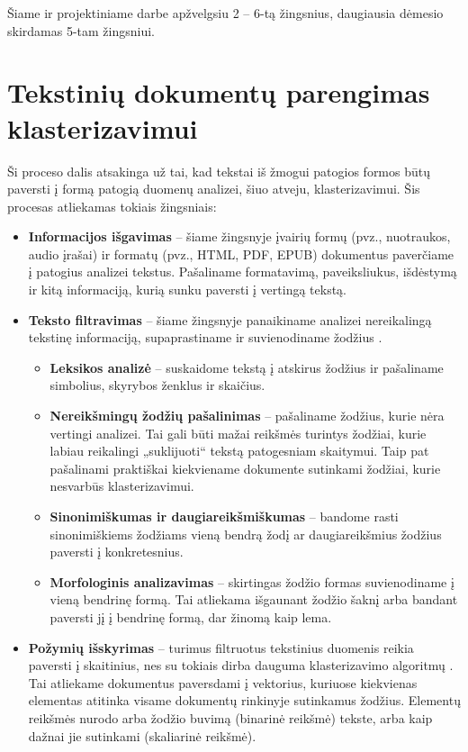 \documentclass{VUMIFInfKursinis}
\begin{document}
Šiame ir projektiniame darbe apžvelgsiu 2 – 6-tą žingsnius, daugiausia
dėmesio skirdamas 5-tam žingsniui.











\section{Tekstinių dokumentų parengimas klasterizavimui}

Ši proceso dalis atsakinga už tai, kad tekstai iš žmogui patogios formos
būtų paversti į formą patogią duomenų analizei, šiuo atveju,
klasterizavimui. Šis procesas atliekamas tokiais žingsniais:

\begin{itemize}
\item
  \textbf{Informacijos išgavimas} – šiame žingsnyje įvairių formų
  (pvz., nuotraukos, audio įrašai) ir formatų (pvz., HTML, PDF, EPUB)
  dokumentus paverčiame į patogius analizei tekstus. Pašaliname
  formatavimą, paveiksliukus, išdėstymą ir kitą informaciją, kurią sunku
  paversti į vertingą tekstą.
\item
  \textbf{Teksto filtravimas} – šiame žingsnyje panaikiname analizei
  nereikalingą tekstinę informaciją, supaprastiname ir suvienodiname
  žodžius \cite{mugunthadevi2011survey}.

  \begin{itemize}
  \item
    \textbf{Leksikos analizė} – suskaidome tekstą į atskirus žodžius ir
    pašaliname simbolius, skyrybos ženklus ir skaičius.
  \item
    \textbf{Nereikšmingų žodžių pašalinimas} – pašaliname žodžius,
    kurie nėra vertingi analizei. Tai gali būti mažai reikšmės turintys
    žodžiai, kurie labiau reikalingi „suklijuoti“ tekstą patogesniam
    skaitymui. Taip pat pašalinami praktiškai kiekviename dokumente
    sutinkami žodžiai, kurie nesvarbūs klasterizavimui.
  \item
    \textbf{Sinonimiškumas ir daugiareikšmiškumas} – bandome rasti
    sinonimiškiems žodžiams vieną bendrą žodį ar daugiareikšmius žodžius
    paversti į konkretesnius.
  \item
    \textbf{Morfologinis analizavimas} – skirtingas žodžio formas
    suvienodiname į vieną bendrinę formą. Tai atliekama išgaunant žodžio
    šaknį arba bandant paversti jį į bendrinę formą, dar žinomą kaip
    lema.
  \end{itemize}
\item
  \textbf{Požymių išskyrimas} – turimus filtruotus tekstinius duomenis
  reikia paversti į skaitinius, nes su tokiais dirba dauguma
  klasterizavimo algoritmų \cite{alelyani2013feature}. Tai atliekame dokumentus paversdami į
  vektorius, kuriuose kiekvienas elementas atitinka visame dokumentų
  rinkinyje sutinkamus žodžius. Elementų reikšmės nurodo arba žodžio
  buvimą (binarinė reikšmė) tekste, arba kaip dažnai jie sutinkami
  (skaliarinė reikšmė).
\end{itemize}
\end{document}
